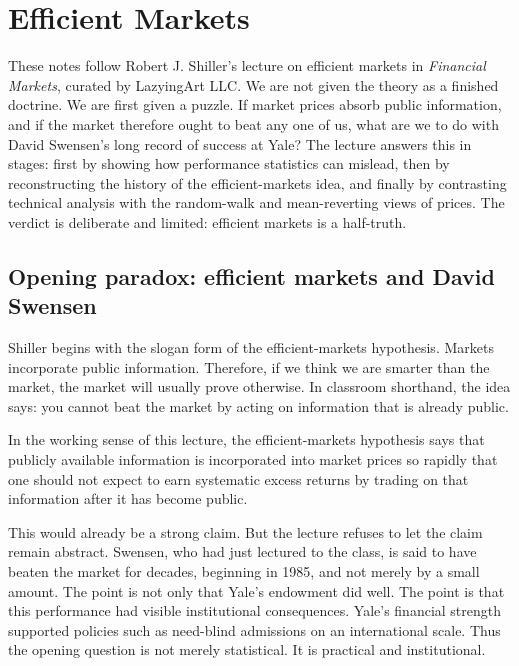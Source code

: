 \chapter{Efficient Markets}

These notes follow Robert J. Shiller's lecture on efficient markets in \emph{Financial Markets}, curated by LazyingArt LLC. We are not given the theory as a finished doctrine. We are first given a puzzle. If market prices absorb public information, and if the market therefore ought to beat any one of us, what are we to do with David Swensen's long record of success at Yale? The lecture answers this in stages: first by showing how performance statistics can mislead, then by reconstructing the history of the efficient-markets idea, and finally by contrasting technical analysis with the random-walk and mean-reverting views of prices. The verdict is deliberate and limited: efficient markets is a half-truth.

\section{Opening paradox: efficient markets and David Swensen}

Shiller begins with the slogan form of the efficient-markets hypothesis. Markets incorporate public information. Therefore, if we think we are smarter than the market, the market will usually prove otherwise. In classroom shorthand, the idea says: you cannot beat the market by acting on information that is already public.

\begin{definition}
In the working sense of this lecture, the efficient-markets hypothesis says that publicly available information is incorporated into market prices so rapidly that one should not expect to earn systematic excess returns by trading on that information after it has become public.
\end{definition}

This would already be a strong claim. But the lecture refuses to let the claim remain abstract. Swensen, who had just lectured to the class, is said to have beaten the market for decades, beginning in 1985, and not merely by a small amount. The point is not only that Yale's endowment did well. The point is that this performance had visible institutional consequences. Yale's financial strength supported policies such as need-blind admissions on an international scale. Thus the opening question is not merely statistical. It is practical and institutional.

